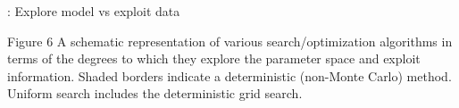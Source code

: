 

\begin{frame}{\titleprefix: Explore model vs exploit data}

  \centering

  \begin{minipage}{0.5\textwidth}
  \end{minipage}
  \begin{minipage}{0.42\textwidth}
    \tiny
    \begin{figureblock}{Figure 6}
      A schematic representation of various search/optimization algorithms
      in terms of the degrees to which they explore the parameter space and
      exploit information.
      Shaded borders indicate a deterministic (non-Monte Carlo) method.
      Uniform search includes the deterministic grid search.
    \end{figureblock}
  \end{minipage}

\end{frame}
